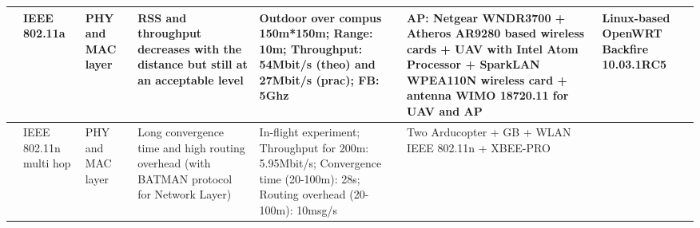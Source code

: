 \documentclass[11pt,openany]{book}
\begin{document}
\begin{landscape}
    \begin{table}[H]
        \centering
        \begin{tabular}{|p{1.5cm}|p{1.7cm}|p{1.3cm}|p{2.9cm}|p{2.7cm}|p{2.3cm}|p{2cm}|}\hline
            [Kuschnig et al., 2012] & IEEE 802.11a           & PHY and MAC layer & RSS and throughput decreases with the distance but still at an acceptable level          & Outdoor over compus 150m*150m; Range: 10m; Throughput: 54Mbit/s (theo) and 27Mbit/s (prac); FB: 5Ghz                        & AP: Netgear WNDR3700 + Atheros AR9280 based wireless cards + UAV with Intel Atom Processor + SparkLAN WPEA110N wireless card + antenna WIMO 18720.11 for UAV and AP & Linux-based OpenWRT Backfire 10.03.1RC5 \\\hline
            [Asadpour et al., 2014] & IEEE 802.11n multi hop & PHY and MAC layer & Long convergence time and high routing overhead (with BATMAN protocol for Network Layer) & In-flight experiment; Throughput for 200m: 5.95Mbit/s; Convergence time (20-100m): 28s; Routing overhead (20-100m): 10msg/s & Two Arducopter + GB + WLAN IEEE 802.11n + XBEE-PRO                                                                                                                  &                                         \\\hline
        \end{tabular}
    \end{table}
\end{landscape}
\end{document}
